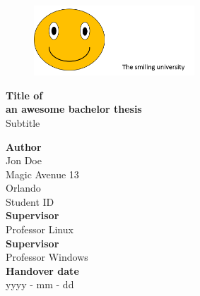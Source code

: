 
\begin{titlepage}
\thispagestyle{empty}

\begin{figure}[h]
\begin{flushright}
\includegraphics[trim= 0 0 0 0 , clip, width=6cm]{logo.png} 
\end{flushright}
\end{figure}
\vspace{0cm} 

\vspace{2cm}
\begin{center}
\Huge
\textbf{Title of } \\
\textbf{an awesome bachelor thesis}\\
\normalsize
\vspace{1cm}
Subtitle


\end{center}

\vspace{3cm}
\textbf{Author}\\
Jon Doe\\
Magic Avenue 13\\
Orlando\\
Student ID \\

\vspace{1cm}
\textbf{Supervisor}\\
Professor Linux \\

\vspace{1cm}
\textbf{Supervisor}\\
Professor Windows \\

\vspace{1cm}
\textbf{Handover date}\\
yyyy - mm - dd 

\end{titlepage}